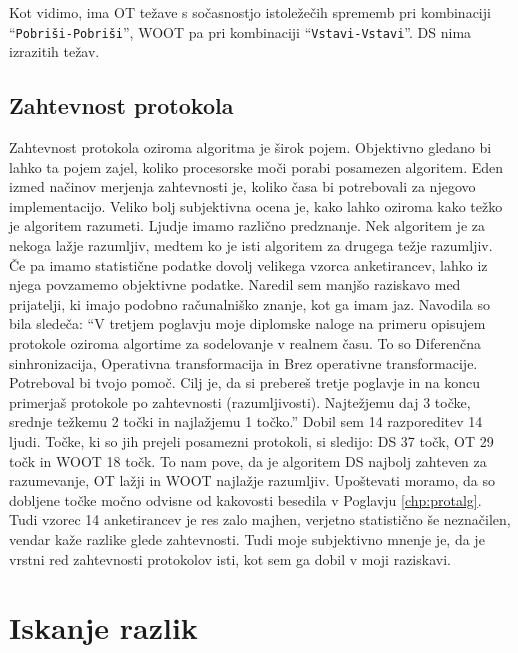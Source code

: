 \documentclass[a4paper, 12pt, twoside]{book}
\begin{document}
Kot vidimo, ima OT težave s sočasnostjo istoležečih sprememb pri kombinaciji “{\tt Pobriši-Pobriši}”, WOOT pa pri kombinaciji “{\tt Vstavi-Vstavi}”. DS nima izrazitih težav.

\section{Zahtevnost protokola}

Zahtevnost protokola oziroma algoritma je širok pojem. Objektivno gledano bi lahko ta pojem zajel, koliko procesorske moči porabi posamezen algoritem. Eden izmed načinov merjenja zahtevnosti je, koliko časa bi potrebovali za njegovo implementacijo. Veliko bolj subjektivna ocena je, kako lahko oziroma kako težko je algoritem razumeti. Ljudje imamo različno predznanje. Nek algoritem je za nekoga lažje razumljiv, medtem ko je isti algoritem za drugega težje razumljiv. Če pa imamo statistične podatke dovolj velikega vzorca anketirancev, lahko iz njega povzamemo objektivne podatke. Naredil sem manjšo raziskavo med prijatelji, ki imajo podobno računalniško znanje, kot ga imam jaz. Navodila so bila sledeča: “V tretjem poglavju moje diplomske naloge na primeru opisujem protokole oziroma algortime za sodelovanje v realnem času. To so Diferenčna sinhronizacija, Operativna transformacija in Brez operativne transformacije. Potreboval bi tvojo pomoč. Cilj je, da si prebereš tretje poglavje in na koncu primerjaš protokole po zahtevnosti (razumljivosti). Najtežjemu daj 3 točke, srednje težkemu 2 točki in najlažjemu 1 točko.” Dobil sem 14 razporeditev 14 ljudi. Točke, ki so jih prejeli posamezni protokoli, si sledijo: DS 37 točk, OT 29 točk in WOOT 18 točk. To nam pove, da je algoritem DS najbolj zahteven za razumevanje, OT lažji in WOOT najlažje razumljiv. Upoštevati moramo, da so dobljene točke močno odvisne od kakovosti besedila v Poglavju \ref{chp:protalg}. Tudi vzorec 14 anketirancev je res zalo majhen, verjetno statistično še neznačilen, vendar kaže razlike glede zahtevnosti. Tudi moje subjektivno mnenje je, da je vrstni red zahtevnosti protokolov isti, kot sem ga dobil v moji raziskavi.

\chapter{Iskanje razlik}
\label{chp:diff}
\end{document}
